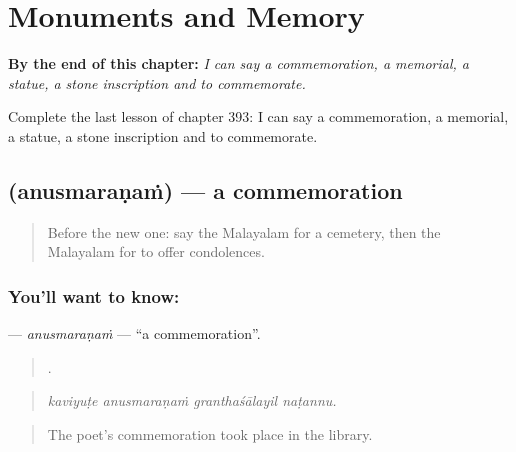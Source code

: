 
\chapter{Monuments and Memory}
\label{ch:ml-monuments-and-memory}

\begin{chapteropening}
\textbf{By the end of this chapter:} \emph{I can say a commemoration, a memorial, a statue, a stone inscription and to commemorate.}

Complete the last lesson of chapter 393: I can say a commemoration, a memorial, a statue, a stone inscription and to commemorate.
\end{chapteropening}

\section[\texorpdfstring{\ml{അനുസ്മരണം} (anusmaraṇaṁ)}{അനുസ്മരണം (anusmaraṇaṁ)}]{ (anusmaraṇaṁ) — a commemoration}

\label{lesson:ML-C393-anusmaranam}



\begin{quote}
Before the new one: say the Malayalam for a cemetery, then the Malayalam for to offer condolences.
\end{quote}

\subsection*{You'll want to know: }
\textbf{} — \emph{anusmaraṇaṁ} — \textquotedblleft{}a commemoration\textquotedblright{}.

\begin{quote}
   .
\end{quote}

\begin{quote}
\emph{kaviyuṭe anusmaraṇaṁ granthaśālayil naṭannu.}
\end{quote}

\begin{quote}
The poet's commemoration took place in the library.
\end{quote}

